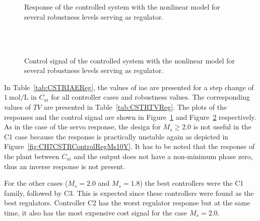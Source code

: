%
\begin{figure}
	\centering
	\\
	\\
	\caption{Response of the controlled system with the nonlinear model for several robustness levels serving as regulator.}
	\label{fig:CH7CSTRControlRegY}
\end{figure}
%
%
\begin{figure}
	\centering
	\\
	\\
	\caption{Control signal of the controlled system with the nonlinear model for several robustness levels serving as regulator.}
	\label{fig:CH7CSTRControlRegU}
\end{figure}
%
In Table~\ref{tab:CSTRIAEReg}, the values of \gls{iae} are presented for a step change of $\SI{1}{\mole\per\liter}$ in $C_{ai}$ for all controller cases and robustness values. The corresponding values of $TV$ are presented in Table~\ref{tab:CSTRTVReg}. The plots of the responses and the control signal are shown in Figure~\ref{fig:CH7CSTRControlRegY} and Figure~\ref{fig:CH7CSTRControlRegU} respectively. As in the case of the servo response, the design for $M_s \geq 2.0$ is not useful in the C1 case because the response is practically unstable again as depicted in Figure~\ref{fig:CH7CSTRControlRegMs10Y}. It has to be noted that the response of the plant between $C_{ai}$ and the output does not have a non-minimum phase zero, thus an inverse response is not present.

For the other cases ($M_s = 2.0$ and $M_s = 1.8$) the best controllers were the C1 family, followed by C3. This is expected since these controllers were found as the best regulators. Controller C2 has the worst regulator response but at the same time, it also has the most expensive cost signal for the case $M_s = 2.0$.

